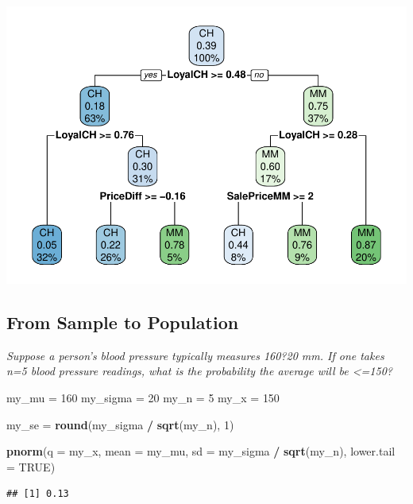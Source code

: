 \documentclass[
]{book}
\newenvironment{Shaded}{\begin{snugshade}}{\end{snugshade}}
\newcommand{\DataTypeTok}[1]{\textcolor[rgb]{0.13,0.29,0.53}{#1}}
\newcommand{\DecValTok}[1]{\textcolor[rgb]{0.00,0.00,0.81}{#1}}
\newcommand{\KeywordTok}[1]{\textcolor[rgb]{0.13,0.29,0.53}{\textbf{#1}}}
\newcommand{\NormalTok}[1]{#1}
\newcommand{\OperatorTok}[1]{\textcolor[rgb]{0.81,0.36,0.00}{\textbf{#1}}}
\newcommand{\OtherTok}[1]{\textcolor[rgb]{0.56,0.35,0.01}{#1}}
\newcommand{\StringTok}[1]{\textcolor[rgb]{0.31,0.60,0.02}{#1}}
\begin{document}
\includegraphics{data-sci_files/figure-latex/unnamed-chunk-26-1.pdf}

\hypertarget{from-sample-to-population}{%
\subsection{From Sample to Population}\label{from-sample-to-population}}

\emph{Suppose a person's blood pressure typically measures 160?20 mm. If one takes n=5 blood pressure readings, what is the probability the average will be \textless=150?}

\begin{Shaded}
\begin{Highlighting}[]
\NormalTok{my_mu =}\StringTok{ }\DecValTok{160}
\NormalTok{my_sigma =}\StringTok{ }\DecValTok{20}
\NormalTok{my_n =}\StringTok{ }\DecValTok{5}
\NormalTok{my_x =}\StringTok{ }\DecValTok{150}

\NormalTok{my_se =}\StringTok{ }\KeywordTok{round}\NormalTok{(my_sigma }\OperatorTok{/}\StringTok{ }\KeywordTok{sqrt}\NormalTok{(my_n), }\DecValTok{1}\NormalTok{)}

\KeywordTok{pnorm}\NormalTok{(}\DataTypeTok{q =}\NormalTok{ my_x, }\DataTypeTok{mean =}\NormalTok{ my_mu, }\DataTypeTok{sd =}\NormalTok{ my_sigma }\OperatorTok{/}\StringTok{ }\KeywordTok{sqrt}\NormalTok{(my_n), }\DataTypeTok{lower.tail =} \OtherTok{TRUE}\NormalTok{)}
\end{Highlighting}
\end{Shaded}

\begin{verbatim}
## [1] 0.13
\end{verbatim}
\end{document}
